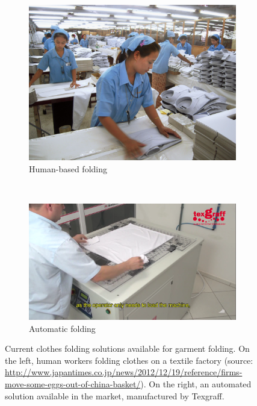 \begin{figure}[htbp]
		\centering
        \begin{subfigure}[l]{0.42\textwidth}
            \centering
    		\includegraphics[width=\textwidth]
    		{figures/Intro_japan_folding.jpg}
			\caption{Human-based folding} %
        \end{subfigure}
        ~
        \begin{subfigure}[r]{0.56\textwidth}
	        \centering
    		\includegraphics[width=\textwidth]
    		{figures/Intro_industrial_folding.png}
		    \caption{Automatic folding}        
		\end{subfigure} 
		\caption{Current clothes folding solutions available for garment folding. On the left, human workers folding clothes on a textile factory (source: {\small \url{http://www.japantimes.co.jp/news/2012/12/19/reference/firms-move-some-eggs-out-of-china-basket/}}). On the right, an automated solution available in the market, manufactured by Texgraff. }
		\label{fig:global_conf_discovery_tripod}
\end{figure}


